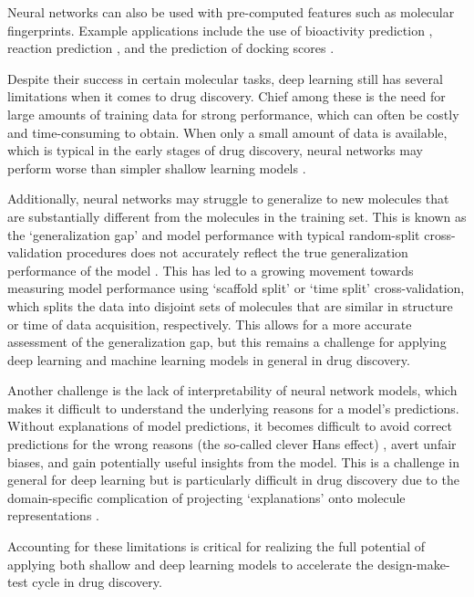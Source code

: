 Neural networks can also be used with pre-computed features such as molecular fingerprints. Example applications include the use of bioactivity prediction \cite{Bender2019}, reaction prediction \cite{Wei2016reactionprediction, segler2017neural}, and the prediction of docking scores \cite{Gentile2020deepdocking}.

Despite their success in certain molecular tasks, deep learning still has several limitations when it comes to drug discovery. Chief among these is the need for large amounts of training data for strong performance, which can often be costly and time-consuming to obtain. When only a small amount of data is available, which is typical in the early stages of drug discovery, neural networks may perform worse than simpler shallow learning models \cite{Jiang2021benchmark}. 

Additionally, neural networks may struggle to generalize to new molecules that are substantially different from the molecules in the training set. This is known as the `generalization gap' and model performance with typical random-split cross-validation procedures does not accurately reflect the true generalization performance of the model \cite{Sheridan2013TimeSplit}. This has led to a growing movement towards measuring model performance using `scaffold split' \cite{wu2017molnet, yang2019chemprop} or `time split' \cite{Sheridan2013TimeSplit} cross-validation, which splits the data into disjoint sets of molecules that are similar in structure or time of data acquisition, respectively. This allows for a more accurate assessment of the generalization gap, but this remains a challenge for applying deep learning and machine learning models in general in drug discovery.

Another challenge is the lack of interpretability of neural network models, which makes it difficult to understand the underlying reasons for a model's predictions. Without explanations of model predictions, it becomes difficult to avoid correct predictions for the wrong reasons (the so-called clever Hans effect) \cite{Lapuschkin2019UnmaskingCleverHans}, avert unfair biases, and gain potentially useful insights from the model. This is a challenge in general for deep learning but is particularly difficult in drug discovery due to the domain-specific complication of projecting `explanations' onto molecule representations \cite{Jimenze2020XAI}.

Accounting for these limitations is critical for realizing the full potential of applying both shallow and deep learning models to accelerate the design-make-test cycle in drug discovery.